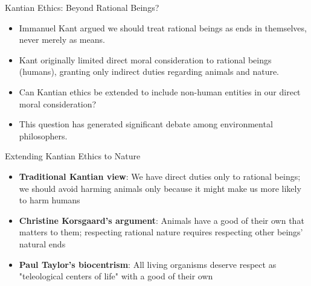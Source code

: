 \documentclass{beamer}
\begin{document}
	\begin{frame}{Kantian Ethics: Beyond Rational Beings?}
		\begin{itemize}
			\item Immanuel Kant argued we should treat rational beings as ends in themselves, never merely as means.
			\item Kant originally limited direct moral consideration to rational beings (humans), granting only indirect duties regarding animals and nature.
			\item Can Kantian ethics be extended to include non-human entities in our direct moral consideration?
			\item This question has generated significant debate among environmental philosophers.
		\end{itemize}
		
		\begin{block}{Extending Kantian Ethics to Nature}
			\scriptsize
			\begin{itemize}
				\item \textbf{Traditional Kantian view}: We have direct duties only to rational beings; we should avoid harming animals only because it might make us more likely to harm humans
				\item \textbf{Christine Korsgaard's argument}: Animals have a good of their own that matters to them; respecting rational nature requires respecting other beings' natural ends
				\item \textbf{Paul Taylor's biocentrism}: All living organisms deserve respect as "teleological centers of life" with a good of their own
			\end{itemize}
		\end{block}
	\end{frame}
	
\end{document}
